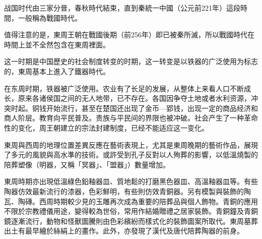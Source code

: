战国时代由三家分晉，春秋時代結束，直到秦統一中國（公元前221年）這段時間，一般稱為戰國時代。

值得注意的是，東周王朝在戰國後期（前256年）即已被秦所滅，所以戰國時代在時間上並不全然包含在東周裡面。

这一时期是中国歷史的社会制度转变的时期，这一转变是以铁器的广泛使用为标志的，東周基本上進入了鐵器時代。

在东周时期，铁器被广泛使用。农业有了长足的发展，从整体上来看人口不断成长，原来各诸侯国之间的无人地带，已不存在。各国因争夺土地或者水利资源，冲突时起。铜钱开始流行，甚至在楚国还出现了金币—郢钱，出现一定的商品经济和商人阶层。教育向平民普及。贵族与平民间的界限也被冲破。社会产生了一种革命性的变化，周王朝建立的宗法封建制度，已经不能适应这一变化。

東周與西周的地理位置差異反應在藝術表現上，尤其是東周晚期的藝術作品，展現了多元的風貌與高水準的技術。或許受到孔子反對以人殉葬的影響，以低溫燒製的陪葬塑像（明器，又稱「冥器」、「盟器」）數量增加。

東周時期亦出現低溫綠色鉛釉器皿、質地鬆的打磨黑色器皿、高溫釉器皿等。有些陶器仿效最新流行的漆器，色彩鮮明，有些則仿效青銅器。另有模製與裝飾的陶瓦、陶磚。西周時期較少見的玉雕再次成為重要的陪葬品與個人飾物。青銅的應用不限於宗教禮儀用途，變得較為世俗，常用作結婚贈禮之居家裝飾。青銅鐘及青銅鏡逐漸流行，動物和怪獸圖騰則由色彩繽紛而樣式化的裝飾圖案所取代。東周墓葬出土有最早繪於絲絹上的畫作。此外，亦發現了漢代及唐代陪葬陶器的前身。





















